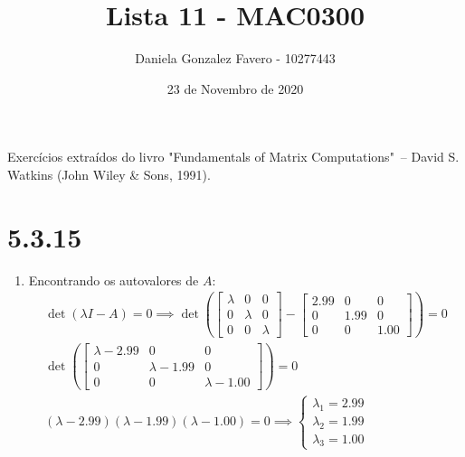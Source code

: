 \documentclass[a4paper,11pt]{article}
\title{Lista 11 - MAC0300}
\author{Daniela Gonzalez Favero - 10277443}
\date{23 de Novembro de 2020}
\begin{document}
    \maketitle
    Exercícios extraídos do livro "Fundamentals of Matrix Computations"\ – David S. Watkins (John Wiley \& Sons, 1991).
    \section*{5.3.15}
        \begin{enumerate}[label=\textbf{(\alph*)}]
            \item Encontrando os autovalores de $A$:
            $$
                \begin{matrix}
                    \det(\lambda I - A) = 0 \implies \det \left (
                    \begin{bmatrix}
                        \lambda & 0 & 0 \\
                        0 & \lambda & 0 \\
                        0 & 0 & \lambda
                    \end{bmatrix}
                    -
                    \begin{bmatrix}
                        2.99 & 0 & 0 \\
                        0 & 1.99 & 0\\
                        0 & 0 & 1.00
                    \end{bmatrix}
                    \right ) = 0
                    \\
                    \det \left (
                    \begin{bmatrix}
                        \lambda - 2.99 & 0 & 0 \\
                        0 & \lambda - 1.99 & 0\\
                        0 & 0 & \lambda - 1.00
                    \end{bmatrix}
                    \right ) = 0
                    \\
                    (\lambda - 2.99)(\lambda - 1.99)(\lambda - 1.00) = 0
                    \implies
                    \begin{cases}
                        \lambda_1 = 2.99
                        \\
                        \lambda_2 = 1.99
                        \\
                        \lambda_3 = 1.00
                    \end{cases}

\end{matrix}$$
\end{enumerate}
\end{document}
